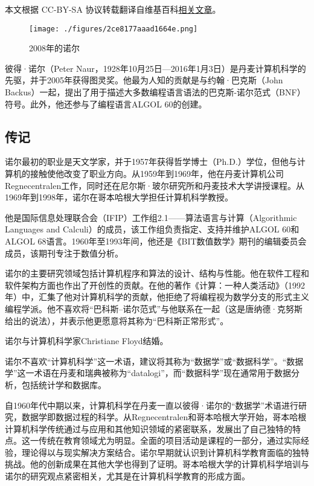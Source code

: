 
本文根据 CC-BY-SA 协议转载翻译自维基百科\href{https://en.wikipedia.org/wiki/Peter_Naur}{相关文章}。

\begin{figure}[ht]
\centering
\texttt{[image: ./figures/2ce8177aaad1664e.png]}
\caption{2008年的诺尔} \label{fig_BDNR_1}
\end{figure}
彼得·诺尔（Peter Naur，1928年10月25日—2016年1月3日）是丹麦计算机科学的先驱，并于2005年获得图灵奖。他最为人知的贡献是与约翰·巴克斯（John Backus）一起，提出了用于描述大多数编程语言语法的巴克斯-诺尔范式（BNF）符号。此外，他还参与了编程语言ALGOL 60的创建。
\subsection{传记}
诺尔最初的职业是天文学家，并于1957年获得哲学博士（Ph.D.）学位，但他与计算机的接触使他改变了职业方向。从1959年到1969年，他在丹麦计算机公司Regnecentralen工作，同时还在尼尔斯·玻尔研究所和丹麦技术大学讲授课程。从1969年到1998年，诺尔在哥本哈根大学担任计算机科学教授。

他是国际信息处理联合会（IFIP）工作组2.1——算法语言与计算（Algorithmic Languages and Calculi）的成员，该工作组负责指定、支持并维护ALGOL 60和ALGOL 68语言。1960年至1993年间，他还是《BIT数值数学》期刊的编辑委员会成员，该期刊专注于数值分析。

诺尔的主要研究领域包括计算机程序和算法的设计、结构与性能。他在软件工程和软件架构方面也作出了开创性的贡献。在他的著作《计算：一种人类活动》（1992年）中，汇集了他对计算机科学的贡献，他拒绝了将编程视为数学分支的形式主义编程学派。他不喜欢将“巴科斯–诺尔范式”与他联系在一起（这是唐纳德·克努斯给出的说法），并表示他更愿意将其称为“巴科斯正常形式”。

诺尔与计算机科学家Christiane Floyd结婚。

诺尔不喜欢“计算机科学”这一术语，建议将其称为“数据学”或“数据科学”。“数据学”这一术语在丹麦和瑞典被称为“datalogi”，而“数据科学”现在通常用于数据分析，包括统计学和数据库。

自1960年代中期以来，计算机科学在丹麦一直以彼得·诺尔的“数据学”术语进行研究，数据学即数据过程的科学。从Regnecentralen和哥本哈根大学开始，哥本哈根计算机科学传统通过与应用和其他知识领域的紧密联系，发展出了自己独特的特点。这一传统在教育领域尤为明显。全面的项目活动是课程的一部分，通过实际经验，理论得以与现实解决方案结合。诺尔早期就认识到计算机科学教育面临的独特挑战。他的创新成果在其他大学也得到了证明。哥本哈根大学的计算机科学培训与诺尔的研究观点紧密相关，尤其是在计算机科学教育的形成方面。

